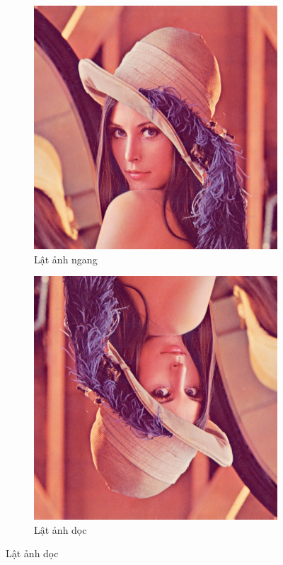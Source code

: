 \documentclass[]{article}
\begin{document}
\begin{figure}[!ht]
  \begin{subfigure}[b]{0.45\linewidth}
    \includegraphics[width=\linewidth]{image/Lenna_flip_horizontal.png}
    \caption{Lật ảnh ngang}
  \end{subfigure}
  \begin{subfigure}[b]{0.45\linewidth}
    \includegraphics[width=\linewidth]{image/Lenna_flip_vertical.png}
    \caption{Lật ảnh dọc}
  \end{subfigure}
\end{figure}
\end{document}
